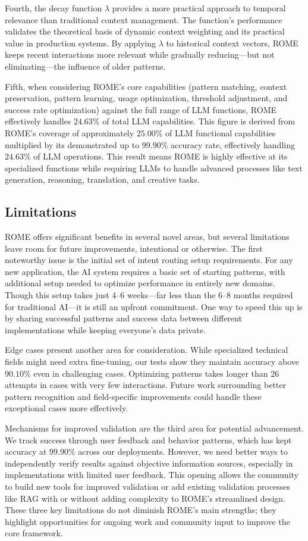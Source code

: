 \documentclass[12pt]{article}
\begin{document}
Fourth, the decay function $\lambda$ provides a more practical approach to temporal relevance than traditional context management. The function's performance validates the theoretical basis of dynamic context weighting and its practical value in production systems. By applying $\lambda$ to historical context vectors, ROME keeps recent interactions more relevant while gradually reducing---but not eliminating---the influence of older patterns.

Fifth, when considering ROME's core capabilities (pattern matching, context preservation, pattern learning, usage optimization, threshold adjustment, and success rate optimization) against the full range of LLM functions, ROME effectively handles $24.63\%$ of total LLM capabilities. This figure is derived from ROME's coverage of approximately $25.00\%$ of LLM functional capabilities multiplied by its demonstrated up to $99.90\%$ accuracy rate, effectively handling $24.63\%$ of LLM operations. This result means ROME is highly effective at its specialized functions while requiring LLMs to handle advanced processes like text generation, reasoning, translation, and creative tasks.

\subsection{Limitations}
ROME offers significant benefits in several novel areas, but several limitations leave room for future improvements, intentional or otherwise. The first noteworthy issue is the initial set of intent routing setup requirements. For any new application, the AI system requires a basic set of starting patterns, with additional setup needed to optimize performance in entirely new domains. Though this setup takes just 4--6 weeks---far less than the 6--8 months required for traditional AI---it is still an upfront commitment. One way to speed this up is by sharing successful patterns and success data between different implementations while keeping everyone's data private.

Edge cases present another area for consideration. While specialized technical fields might need extra fine-tuning, our tests show they maintain accuracy above $90.10\%$ even in challenging cases. Optimizing patterns takes longer than 26 attempts in cases with very few interactions. Future work surrounding better pattern recognition and field-specific improvements could handle these exceptional cases more effectively.

Mechanisms for improved validation are the third area for potential advancement. We track success through user feedback and behavior patterns, which has kept accuracy at $99.90\%$ across our deployments. However, we need better ways to independently verify results against objective information sources, especially in implementations with limited user feedback. This opening allows the community to build new tools for improved validation or add existing validation processes like RAG with or without adding complexity to ROME's streamlined design. These three key limitations do not diminish ROME's main strengths; they highlight opportunities for ongoing work and community input to improve the core framework.
\end{document}
